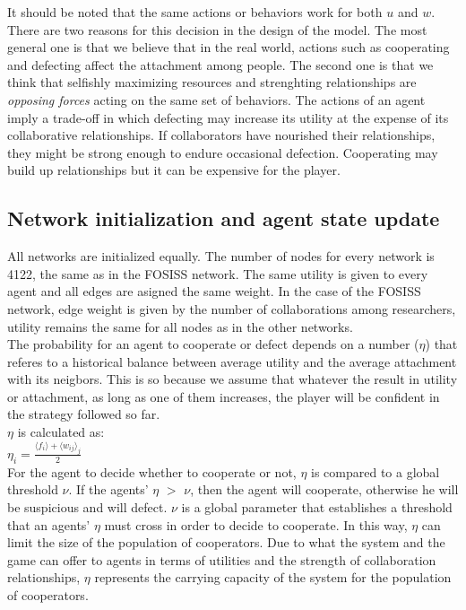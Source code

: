 \documentclass[11pt]{article}
\begin{document}
{\color{red} It should be noted that the same actions or behaviors work for
  both $u$ and $w$. There are two reasons for this decision in the design of the
model. The most general one is that we believe that in the real world,
actions such as cooperating and defecting affect the attachment
among people. The second one is that we think that selfishly maximizing resources and
strenghting relationships are \emph{opposing forces} acting on the same set of
behaviors. The actions of an agent imply a trade-off in which defecting may
increase its utility at the expense of its collaborative relationships. If
collaborators have nourished their relationships, they might be strong enough to
endure occasional defection. Cooperating may build up relationships but it can be
expensive for the player.}

\subsection{Network initialization and agent state update}

All networks are initialized equally. The number of nodes for every network is 4122, the same as in the FOSISS network.
The same utility is given to every agent and all edges are asigned the same weight. In the case of the FOSISS
network, edge weight is given by the number of collaborations among researchers, utility remains the same for all nodes as in
the other networks.\\

The probability for an agent to cooperate or defect depends on a
number ($\eta$) that referes to a historical balance between average utility and
the average attachment with its neigbors.   {\color{red} This is so
  because we assume that whatever the result in utility or attachment, as long
  as one of them increases, the player will be confident in the strategy
  followed so far}.\\   

$\eta$ is calculated as:\\ 


$\eta_i = \frac{\langle f_i \rangle + \langle w_{ij} \rangle _j}{2}$\\

{\color{red} For the agent to decide whether to cooperate or not, $\eta$ is
  compared to a global threshold $\nu$. If the agents' $\eta$ $>$ $\nu$,
  then the agent will cooperate, otherwise he will be suspicious and will
  defect. $\nu$ is a global parameter that establishes a threshold that an
  agents' $\eta$ must cross in order to decide to cooperate. In this way,
  $\eta$ can limit the size of the population of cooperators. Due
  to what the system and the game can offer to agents in terms of utilities and the strength
  of collaboration relationships, $\eta$ represents the carrying capacity of the
  system for the population of cooperators}.  
\end{document}
